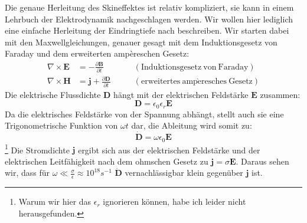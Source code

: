 Die genaue Herleitung des Skineffektes ist relativ kompliziert, sie kann in einem Lehrbuch der Elektrodynamik nachgeschlagen werden. %
Wir wollen hier lediglich eine einfache Herleitung der Eindringtiefe nach \cite{Gerthsen} beschreiben.
Wir starten dabei mit den Maxwellgleichungen, genauer gesagt mit dem Induktionsgesetz von Faraday und dem erweiterten ampèreschen Gesetz:
\begin{align}
\nabla \times \mathbf{E} &= -\frac{\partial \mathbf{B}}{\partial t} \qquad &\mathrm{(Induktionsgesetz\ von\ Faraday)} \\
\nabla \times \mathbf{H} &= \mathbf{j} + \frac{\partial \mathbf{D}}{\partial t} \qquad &\mathrm{(erweitertes\ amp\grave{e}resches\ Gesetz)}
\end{align}
Die elektrische Flussdichte $\mathbf{D}$ hängt mit der elektrischen Feldstärke $\mathbf{E}$ zusammen:
\begin{equation}
\mathbf D = \epsilon_0 \epsilon_r \mathbf{E}
\end{equation}
Da die elektrisches Feldstärke von der Spannung abhängt, stellt auch sie eine Trigonometrische Funktion von $\omega t$ dar, die Ableitung wird somit zu:
\begin{equation}
\mathbf{\dot{D}} = \omega \epsilon_0 \mathbf{E}
\end{equation}\footnote{Warum wir hier das $\epsilon_r$ ignorieren können, habe ich leider nicht herausgefunden.}
Die Stromdichte $\mathbf{j}$ ergibt sich aus der elektrischen Feldstärke und der elektrischen Leitfähigkeit nach dem ohmschen Gesetz zu $\mathbf{j} = \sigma \mathbf E$. Daraus sehen wir, dass für $\omega \ll \frac{\sigma}{\epsilon} \approx 10^{18} s^{-1}$ $\mathbf{\dot{D}}$ vernachlässigbar klein gegenüber $\mathbf{j}$ ist.

